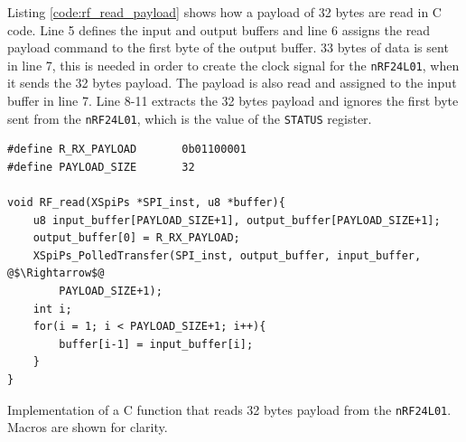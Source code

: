 Listing \ref{code:rf_read_payload} shows how a payload of 32 bytes are read in C code. 
Line 5 defines the input and output buffers and line 6 assigns the read payload command to the first byte of the output buffer.
33 bytes of data is sent in line 7, this is needed in order to create the clock signal for the \texttt{nRF24L01}, when it sends the 32 bytes payload.
The payload is also read and assigned to the input buffer in line 7.
Line 8-11 extracts the 32 bytes payload and ignores the first byte sent from the \texttt{nRF24L01}, which is the value of the \texttt{STATUS} register.

\begin{listing}[!h]
\begin{verbatim}
#define R_RX_PAYLOAD       0b01100001
#define PAYLOAD_SIZE       32

void RF_read(XSpiPs *SPI_inst, u8 *buffer){
	u8 input_buffer[PAYLOAD_SIZE+1], output_buffer[PAYLOAD_SIZE+1];
	output_buffer[0] = R_RX_PAYLOAD;
	XSpiPs_PolledTransfer(SPI_inst, output_buffer, input_buffer, @$\Rightarrow$@
		PAYLOAD_SIZE+1);
	int i;
	for(i = 1; i < PAYLOAD_SIZE+1; i++){
		buffer[i-1] = input_buffer[i];
	}
}
\end{verbatim}
\caption{Implementation of a C function that reads 32 bytes payload from the \texttt{nRF24L01}. Macros are shown for clarity.}
\label{code:rf_read_payload}
\end{listing}


